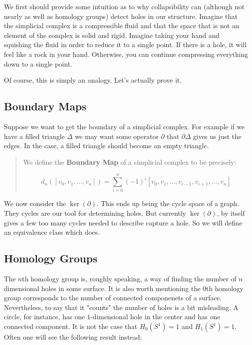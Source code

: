 \documentclass[letterpaper,12pt]{article}
\begin{document}
We first should provide some intuition as to why collapsibility can (although not nearly as well as homology groups) detect holes in our structure. Imagine that the simplicial complex is a compressible fluid and that the space that is not an element of the complex is solid and rigid. Imagine taking your hand and squishing the fluid in order to reduce it to a single point. If there is a hole, it will feel like a rock in your hand. Otherwise, you can continue compressing everything down to a single point.

Of course, this is simply an analogy. Let's actually prove it.

\subsection{Boundary Maps}

Suppose we want to get the boundary of a simplicial complex. For example if we have a filled triangle $\Delta$ we may want some operator $\partial$ that $\partial \Delta$ gives us just the edges. In the case, a filled triangle should become an empty triangle.

\begin{quote}
    We define the \textbf{Boundary Map} of a simplicial complex to be precisely:
    
    $$d_n([v_0,v_1,\ldots,v_n]) = \sum_{i=0}^n (-1)^i[v_0,v_1,\ldots,v_{i-1},v_{i+1},\ldots,v_n ]$$
\end{quote}

We now consider the $\ker(\partial)$. This ends up being the cycle space of a graph. They cycles are our tool for determining holes. But currently $\ker(\partial)$, by itself gives a few too many cycles needed to describe capture a hole. So we will define an equivalence class which does.

\subsection{Homology Groups}

The $n$th homology group is, roughly speaking, a way of finding the number of $n$ dimensional holes in some surface. It is also worth mentioning the $0$th homology group corresponds to the number of connected componenets of a surface. Nevertheless, to say that it "counts" the number of holes is a bit misleading. A circle, for instance, has one $1$-dimensional hole in the center and has one connected component. It is not the case that $H_0(S^1) = 1$ and $H_1(S^1) = 1$. Often one will see the following result instead:
\end{document}
